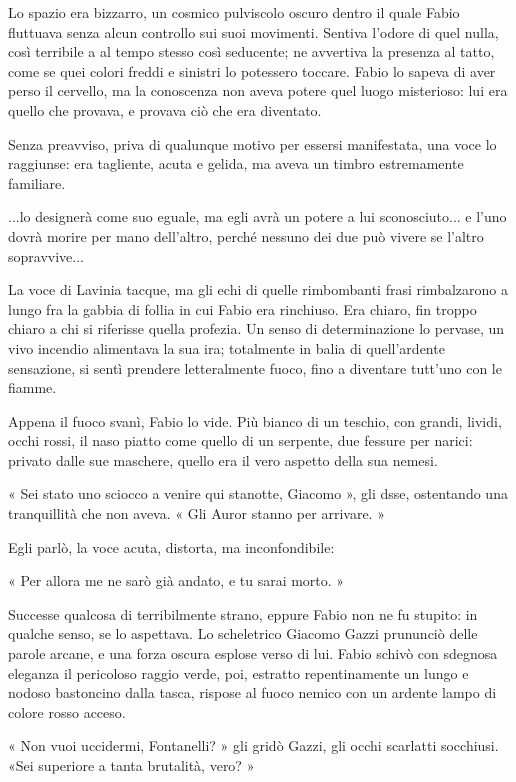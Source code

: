 Lo spazio era bizzarro, un cosmico pulviscolo oscuro dentro il quale Fabio fluttuava senza alcun controllo sui suoi movimenti. Sentiva l'odore di quel nulla, così terribile a al tempo stesso così seducente; ne avvertiva la presenza al tatto, come se quei colori freddi e sinistri lo potessero toccare. Fabio lo sapeva di aver perso il cervello, ma la conoscenza non aveva potere quel luogo misterioso: lui era quello che provava, e provava ciò che era diventato.

Senza preavviso, priva di qualunque motivo per essersi manifestata, una voce lo raggiunse: era tagliente, acuta e gelida, ma aveva un timbro estremamente familiare.

...lo designerà come suo eguale, ma egli avrà un potere a lui sconosciuto...
e l'uno dovrà morire per mano dell'altro, perché nessuno dei due può vivere se l'altro sopravvive...

La voce di Lavinia tacque, ma gli echi di quelle rimbombanti frasi rimbalzarono a lungo fra la gabbia di follia in cui Fabio era rinchiuso. Era chiaro, fin troppo chiaro a chi si riferisse quella profezia. Un senso di determinazione lo pervase, un vivo incendio alimentava la sua ira; totalmente in balia di quell'ardente sensazione, si sentì prendere letteralmente fuoco, fino a diventare tutt'uno con le fiamme.

Appena il fuoco svanì, Fabio lo vide. Più bianco di un teschio, con grandi, lividi, occhi rossi, il naso piatto come quello di un serpente, due fessure per narici: privato dalle sue maschere, quello era il vero aspetto della sua nemesi.

« Sei stato uno sciocco a venire qui stanotte, Giacomo », gli dsse, ostentando una tranquillità che non aveva. « Gli Auror stanno per arrivare. »

Egli parlò, la voce acuta, distorta, ma inconfondibile:

« Per allora me ne sarò già andato, e tu sarai morto. »

Successe qualcosa di terribilmente strano, eppure Fabio non ne fu stupito: in qualche senso, se lo aspettava. Lo scheletrico Giacomo Gazzi prununciò delle parole arcane, e una forza oscura esplose verso di lui. Fabio schivò con sdegnosa eleganza il pericoloso raggio verde, poi, estratto repentinamente un lungo e nodoso bastoncino dalla tasca, rispose al fuoco nemico con un ardente lampo di colore rosso acceso.

« Non vuoi uccidermi, Fontanelli? » gli gridò Gazzi, gli occhi scarlatti socchiusi. «Sei superiore a tanta brutalità, vero? »

